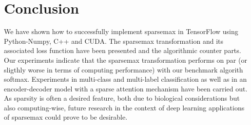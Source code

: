 \section{Conclusion}
We have shown how to successfully implement sparsemax in TensorFlow using Python-Numpy, C++ and CUDA. The sparsemax transformation and its associated loss function have been presented and the algorithmic counter parts. Our experiments indicate that the sparsemax transformation performs on par (or sligthly worse in terms of computing performance) with our benchmark algorith softmax. Experiments in multi-class and multi-label classification as well as in an encoder-decoder model with a sparse attention mechanism have been carried out. As sparsity is often a desired feature, both due to biological considerations but also computing-wise, future research in the context of deep learning applications of sparsemax could prove to be desirable.